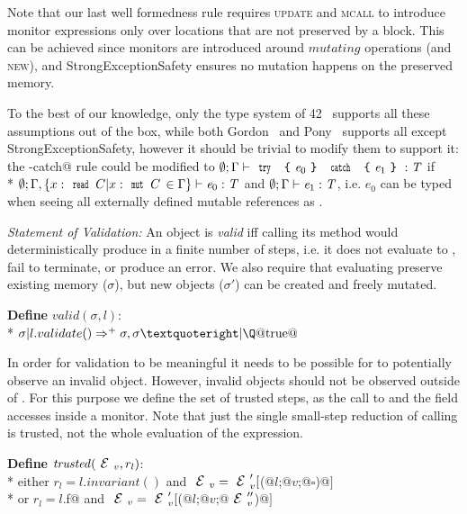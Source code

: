 
Note that our last well formedness rule requires 
\textsc{update} and \textsc{mcall} to introduce
monitor expressions only over locations
that are not preserved by a \Q@try@ block.
This can be achieved since monitors are introduced
around $\mathit{mutating}$ operations
(and \textsc{new}),
and StrongExceptionSafety ensures no mutation happens on the preserved memory.

To the best of our knowledge, only the type system of 42~\cite{ServettoEtAl13a,ServettoZucca15}
 supports all these assumptions out of the box,
while both Gordon~\cite{GordonEtAl12} and Pony~\cite{clebsch2015deny,clebsch2017orca} supports all except StrongExceptionSafety,
however it should be trivial to modify them to support it:
the \Q@try-catch@ rule could be modified to
$\emptyset;\Gamma\vdash\Kw{try}\ \oC\e_0\cC\ \Kw{catch}\ \oC\e_1\cC:\T$
if\\* $\emptyset;
\Gamma,\{x:\Kw{read}\,C | x:\Kw{mut}\,C\,\in\Gamma\}
\vdash\e_0:\T$ and $\emptyset;\Gamma\vdash\e_1:\T$,
i.e. $e_0$ can be typed when seeing all externally defined mutable references as \Q@read@.

\loseSpace
\noindent\textit{Statement of Validation:}
An object is \emph{valid} iff calling its \validate{} method would
deterministically produce \Q@true@ in a finite number of steps, i.e. it does not evaluate to \Q@false@, fail to terminate, or produce an error.
We also require that evaluating \validate{} preserve existing memory ($\sigma$), but new objects ($\sigma'$) can be created and freely mutated.

\noindent\textbf{Define} $valid(\sigma,l)$:\\*
\indent $\sigma | l.validate()\Rightarrow^+ \sigma,\sigma’ | \text{\Q@true@}$

\noindent In order for validation to be meaningful it needs to be possible for \validate{} to potentially observe an invalid object. However, invalid objects should not be observed outside of \validate.
For this purpose we define the set of trusted steps, 
as the call to \validate{} and the field accesses inside a monitor.
Note that just the single small-step reduction
of calling \validate{} is trusted, not the whole evaluation of the \validate{} expression.


\noindent\textbf{Define} $\mathit{trusted}(\ctx_v,r_l)$:\\*
\indent either
$r_l=l.invariant()$ and
 $\ctx_v=\ctx_v'[$\Q@M(@$l$\Q@;@$v$\Q@;@$\square$\Q@)@$]$\\*
\indent or
$r_l=l$\Q@.f@ and
 $\ctx_v=\ctx_v'[$\Q@M(@$l$\Q@;@$v$\Q@;@$\ctx_v''$\Q@)@$]$

